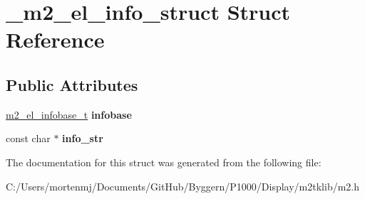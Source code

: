 \hypertarget{struct__m2__el__info__struct}{\section{\-\_\-m2\-\_\-el\-\_\-info\-\_\-struct Struct Reference}
\label{struct__m2__el__info__struct}
}
\subsection*{Public Attributes}
\begin{DoxyCompactItemize}
\item 
\hypertarget{struct__m2__el__info__struct_a5c0e9076bf145f868c5a703d75016d04}{\hyperlink{struct__m2__el__infobase__struct}{m2\-\_\-el\-\_\-infobase\-\_\-t} {\bfseries infobase}}\label{struct__m2__el__info__struct_a5c0e9076bf145f868c5a703d75016d04}

\item 
\hypertarget{struct__m2__el__info__struct_a1bea23b05ef3c247c85e041045a5e06d}{const char $\ast$ {\bfseries info\-\_\-str}}\label{struct__m2__el__info__struct_a1bea23b05ef3c247c85e041045a5e06d}

\end{DoxyCompactItemize}


The documentation for this struct was generated from the following file\-:\begin{DoxyCompactItemize}
\item 
C\-:/\-Users/mortenmj/\-Documents/\-Git\-Hub/\-Byggern/\-P1000/\-Display/m2tklib/m2.\-h\end{DoxyCompactItemize}
